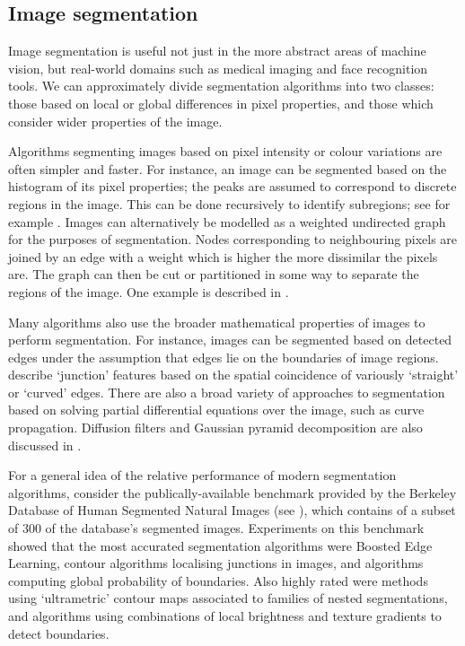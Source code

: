 \subsection{Image segmentation}

Image segmentation is useful not just in the more abstract areas of machine vision, but real-world domains such as medical imaging and face recognition tools. We can approximately divide segmentation algorithms into two classes: those based on local or global differences in pixel properties, and those which consider wider properties of the image.

Algorithms segmenting images based on pixel intensity or colour variations are often simpler and faster. For instance, an image can be segmented based on the histogram of its pixel properties; the peaks are assumed to correspond to discrete regions in the image. This can be done recursively to identify subregions; see for example \cite{recurse-segment}. Images can alternatively be modelled as a weighted undirected graph for the purposes of segmentation. Nodes corresponding to neighbouring pixels are joined by an edge with a weight which is higher the more dissimilar the pixels are. The graph can then be cut or partitioned in some way to separate the regions of the image. One example is described in \cite{image-graph}.

Many algorithms also use the broader mathematical properties of images to perform segmentation. For instance, images can be segmented based on detected edges under the assumption that edges lie on the boundaries of image regions. \cite{edge-segment} describe `junction' features based on the spatial coincidence of variously `straight' or `curved' edges. There are also a broad variety of approaches to segmentation based on solving partial differential equations over the image, such as curve propagation. Diffusion filters and Gaussian pyramid decomposition are also discussed in \cite{efficient-segmentation}.

For a general idea of the relative performance of modern segmentation algorithms, consider the publically-available benchmark provided by the Berkeley Database of Human Segmented Natural Images (see \cite{seg-database}), which contains of a subset of 300 of the database's segmented images. Experiments on this benchmark showed that the most accurated segmentation algorithms were Boosted Edge Learning, contour algorithms localising junctions in images, and algorithms computing global probability of boundaries. Also highly rated were methods using `ultrametric' contour maps associated to families of nested segmentations, and algorithms using combinations of local brightness and texture gradients to detect boundaries.
